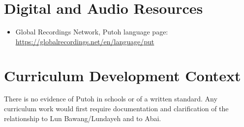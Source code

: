 \documentclass[12pt]{article}
\begin{document}
\section{Digital and Audio Resources}
\begin{itemize}
\item Global Recordings Network, Putoh language page: \url{https://globalrecordings.net/en/language/put}
\end{itemize}

\section{Curriculum Development Context}
There is no evidence of Putoh in schools or of a written standard. Any curriculum work would first require documentation and clarification of the relationship to Lun Bawang/Lundayeh and to Abai.
\end{document}
